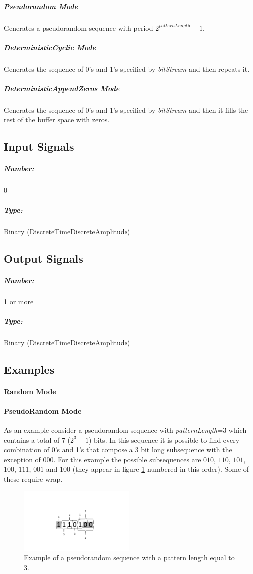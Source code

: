 \subparagraph*{Pseudorandom Mode}
Generates a pseudorandom sequence with period $2^\textit{patternLength}-1$.

\subparagraph*{DeterministicCyclic Mode}
Generates the sequence of 0's and 1's specified by \textit{bitStream} and then repeats it.

\subparagraph*{DeterministicAppendZeros Mode}
Generates the sequence of 0's and 1's specified by \textit{bitStream} and then it fills the rest of the buffer space with zeros.

\subsection*{Input Signals}


\subparagraph*{Number:} 0

\subparagraph*{Type:} Binary (DiscreteTimeDiscreteAmplitude)

\subsection*{Output Signals}

\subparagraph*{Number:} 1 or more

\subparagraph*{Type:} Binary (DiscreteTimeDiscreteAmplitude)

\subsection*{Examples}

\paragraph*{Random Mode}

\paragraph*{PseudoRandom Mode}
As an example consider a pseudorandom sequence with \textit{patternLength}=3 which contains a total of 7 ($2^3-1$) bits. In this sequence it is possible to find every combination of 0's and 1's that compose a 3 bit long subsequence with the exception of $000$. For this example the possible subsequences are $010$, $110$, $101$, $100$, $111$, $001$ and $100$ (they appear in figure \ref{BinarySequenceN3} numbered in this order). Some of these require wrap.

\begin{figure}[h]
	\centering
\includegraphics[width=0.5\textwidth]{./lib/binary_source/figures/BinarySequenceN3}
\caption{Example of a pseudorandom sequence with a pattern length equal to 3.}\label{BinarySequenceN3}
\end{figure}

